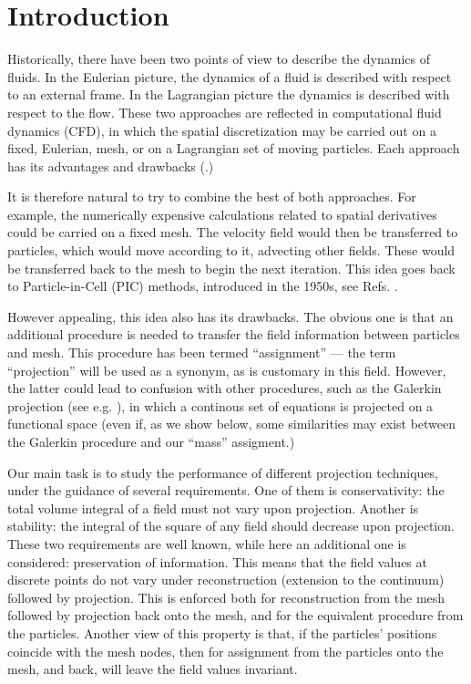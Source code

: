 \documentclass{ws-ijcm}
\begin{document}

%



\section{Introduction}
\label{sec:intro}

Historically, there have been two points of view to describe the
dynamics of fluids. In the Eulerian picture, the dynamics of a fluid
is described with respect to an external frame. In the Lagrangian
picture the dynamics is described with respect to the flow. These two
approaches are reflected in computational fluid dynamics (CFD), in
which the spatial discretization may be carried out on a fixed,
Eulerian, mesh, or on a Lagrangian set of moving particles. Each
approach has its advantages and drawbacks (\cite{violeau2012fluid}.)

It is therefore natural to try to combine the best of both approaches.
For example, the numerically expensive calculations related to spatial
derivatives could be carried on a fixed mesh. The velocity field would
then be transferred to particles, which would move according to it,
advecting other fields. These would be transferred back to the mesh to
begin the next iteration. This idea goes back to Particle-in-Cell
(PIC) methods, introduced in the 1950s, see Refs.
\cite{evans1957,PIC2}.

However appealing, this idea also has its drawbacks. The obvious one
is that an additional procedure is needed to transfer the field
information between particles and mesh. This procedure has been termed
``assignment'' --- the term ``projection'' will be used as a synonym,
as is customary in this field. However, the latter could lead to
confusion with other procedures, such as the Galerkin projection
(see e.g. \cite{rapun2010reduced}), in which a continous set of equations
is projected on a functional space (even if, as we show below, some
similarities may exist between the Galerkin procedure and our ``mass''
assigment.)

Our main task is to study the performance of different projection
techniques, under the guidance of several requirements. One of them is
conservativity: the total volume integral of a field must not vary
upon projection. Another is stability: the integral of the square of
any field should decrease upon projection. These two requirements are
well known, while here an additional one is considered: preservation
of information. This means that the field values at discrete points do
not vary under reconstruction (extension to the continuum) followed by
projection. This is enforced both for reconstruction from the mesh
followed by projection back onto the mesh, and for the equivalent
procedure from the particles. Another view of this property is that,
if the particles' positions coincide with the mesh nodes, then for
assignment from the particles onto the mesh, and back, will leave
the field values invariant.
\end{document}
